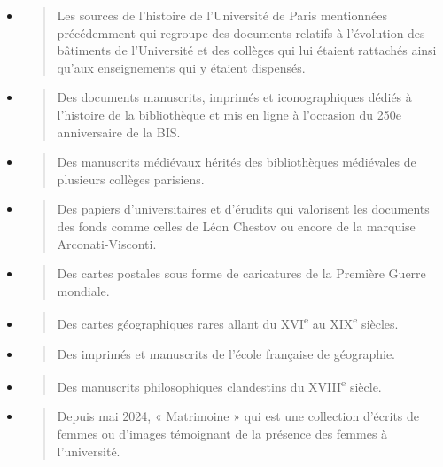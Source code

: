 \documentclass[a4paper,12pt,twoside]{book}
\begin{document}
\begin{itemize}
	\item
	\begin{quote}
		Les sources de l'histoire de l'Université de Paris mentionnées précédemment qui regroupe des
		documents relatifs à l'évolution des bâtiments de l'Université et des
		collèges qui lui étaient rattachés ainsi qu'aux enseignements qui y
		étaient dispensés.
	\end{quote}
	\item
	\begin{quote}
		Des documents manuscrits, imprimés et iconographiques dédiés à
		l'histoire de la bibliothèque et mis en ligne à l'occasion du 250e
		anniversaire de la BIS.
	\end{quote}
	\item
	\begin{quote}
		Des manuscrits médiévaux hérités des bibliothèques médiévales de
		plusieurs collèges parisiens.
	\end{quote}
	\item
	\begin{quote}
		Des papiers d'universitaires et d'érudits qui valorisent les documents
		des fonds comme celles de Léon Chestov ou encore de la marquise
		Arconati-Visconti.
	\end{quote}
	\item
	\begin{quote}
		Des cartes postales sous forme de caricatures de la Première Guerre mondiale.
	\end{quote}
	\item
	\begin{quote}
		Des cartes géographiques rares allant du XVI\textsuperscript{e} au
		XIX\textsuperscript{e} siècles.
	\end{quote}
	\item
	\begin{quote}
		Des imprimés et manuscrits de l'école française de géographie.
	\end{quote}
	\item
	\begin{quote}
		Des manuscrits philosophiques clandestins du XVIII\textsuperscript{e}
		siècle.
	\end{quote}
	\item
	\begin{quote}
		Depuis mai 2024, « Matrimoine » qui est une collection d'écrits de
		femmes ou d'images témoignant de la présence des femmes à
		l'université. \\
	\end{quote}
\end{itemize}
\end{document}

